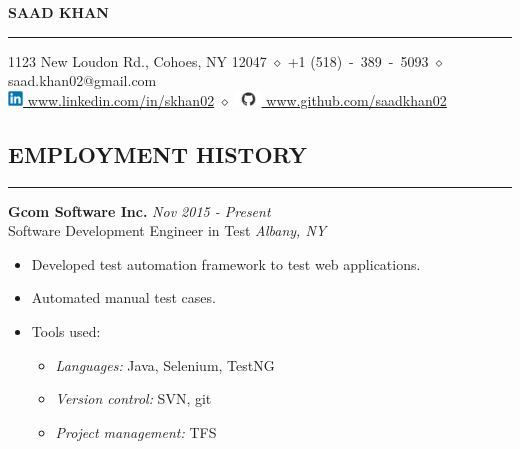 \documentclass{article}
\begin{document}
%
\begin{center}
    {\MakeUppercase{\huge\bf Saad Khan}} \\
    \bigskip
    \hrule
    \bigskip
    1123 New Loudon Rd., Cohoes, NY 12047
    $\diamond$
    +1 (518)~-~389~-~5093
    $\diamond$
    saad.khan02@gmail.com
    \\
    \href{https://www.linkedin.com/in/skhan02}
         {\includegraphics[width=4mm]{linkedin.png} www.linkedin.com/in/skhan02}
    $\diamond$
    \href{https://www.github.com/saadkhan02}
         {\includegraphics[width=7mm]{github.png} www.github.com/saadkhan02}
    \\
    \smallskip
\end{center}

%
\subsection*{\MakeUppercase{\bf Employment History}}
    \hrule
    \bigskip

    {\bf Gcom Software Inc.} \hfill {\em Nov 2015 - Present} \\
    Software Development Engineer in Test \hfill {\em Albany, NY} \\
    \begin{itemize}
    \item Developed test automation framework to test web applications.
    \item Automated manual test cases.
    \item Tools used:
          \begin{itemize}
          \item {\it Languages:} Java, Selenium, TestNG
          \item {\it Version control:} SVN, git
          \item {\it Project management:} TFS
          \end{itemize}
    \end{itemize}
    \smallskip
\end{document}

